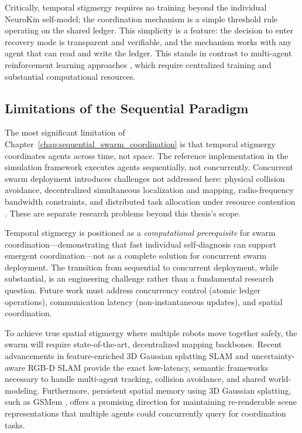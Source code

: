 \documentclass[12pt,a4paper,oneside]{report}
\begin{document}
Critically, temporal stigmergy requires no training beyond the individual NeuroKin self-model; the coordination mechanism is a simple threshold rule operating on the shared ledger. This simplicity is a feature: the decision to enter recovery mode is transparent and verifiable, and the mechanism works with any agent that can read and write the ledger. This stands in contrast to multi-agent reinforcement learning approaches \cite{domberg2026selfadapting, daneshmand2026slowrl}, which require centralized training and substantial computational resources.

\subsection{Limitations of the Sequential Paradigm}
\label{subsec:limitations_of_the_sequential_paradigm}

The most significant limitation of Chapter~\ref{chap:sequential_swarm_coordination} is that temporal stigmergy coordinates agents across time, not space. The reference implementation in the simulation framework executes agents sequentially, not concurrently. Concurrent swarm deployment introduces challenges not addressed here: physical collision avoidance, decentralized simultaneous localization and mapping, radio-frequency bandwidth constraints, and distributed task allocation under resource contention \cite{matsuki2024gaussian, keetha2024splattam}. These are separate research problems beyond this thesis's scope.

Temporal stigmergy is positioned as a \textit{computational prerequisite} for swarm coordination—demonstrating that fast individual self-diagnosis can support emergent coordination—not as a complete solution for concurrent swarm deployment. The transition from sequential to concurrent deployment, while substantial, is an engineering challenge rather than a fundamental research question. Future work must address concurrency control (atomic ledger operations), communication latency (non-instantaneous updates), and spatial coordination. 

To achieve true spatial stigmergy where multiple robots move together safely, the swarm will require state-of-the-art, decentralized mapping backbones. Recent advancements in feature-enriched 3D Gaussian splatting SLAM \cite{thirgood2025featureslam} and uncertainty-aware RGB-D SLAM \cite{tran2025varsplat} provide the exact low-latency, semantic frameworks necessary to handle multi-agent tracking, collision avoidance, and shared world-modeling. Furthermore, persistent spatial memory using 3D Gaussian splatting, such as GSMem \cite{lu2025gsmem}, offers a promising direction for maintaining re-renderable scene representations that multiple agents could concurrently query for coordination tasks.
\end{document}

